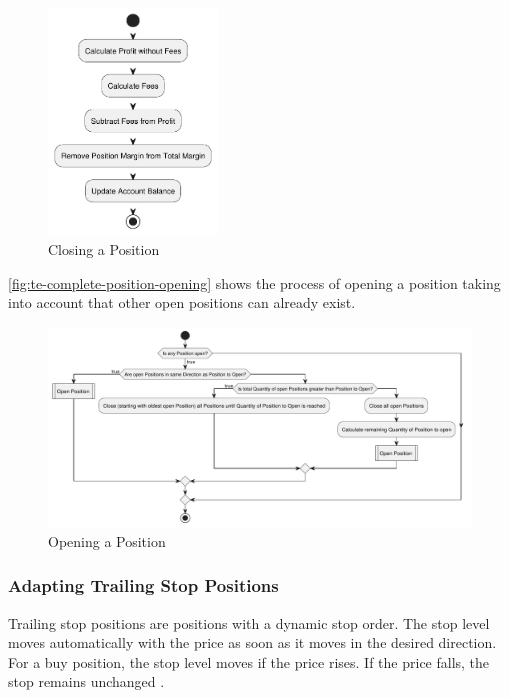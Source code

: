\begin{figure}[H]
    \centering
    \includegraphics[width=0.4\textwidth]{images/trading-engine/position-closing}
    \caption{Closing a Position}
    \label{fig:te-position-closing}
\end{figure}

\noindent
\autoref{fig:te-complete-position-opening} shows the process of opening a position taking into account that other open positions can already exist.


\begin{figure}[H]
    \centering
    \includegraphics[width=\textwidth]{images/trading-engine/complete-position-opening}
    \caption{Opening a Position}
    \label{fig:te-complete-position-opening}
\end{figure}

\subsubsection{Adapting Trailing Stop Positions}

Trailing stop positions are positions with a dynamic stop order.
The stop level moves automatically with the price as soon as it moves in the desired direction.
For a buy position, the stop level moves if the price rises.
If the price falls, the stop remains unchanged \cite{ig-trailing}.

